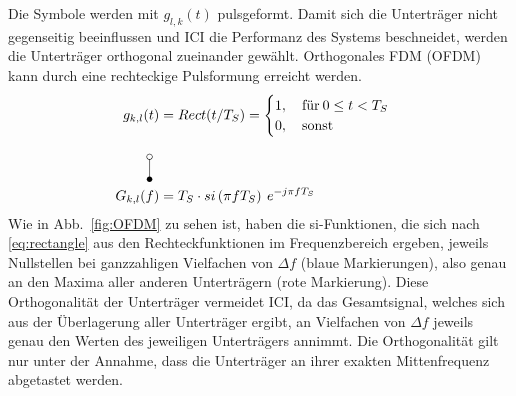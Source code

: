 Die Symbole werden mit $g_{l,k}(t)$ pulsgeformt. Damit sich die Unterträger nicht gegenseitig beeinflussen und \ac{ICI} die Performanz des Systems beschneidet, werden die Unterträger orthogonal zueinander gewählt. Orthogonales \ac{FDM} (OFDM) kann durch eine rechteckige Pulsformung erreicht werden. 
\begin{equation}
\label{eq:rectangle}
\begin{aligned}
g_{k,l}(t) &= Rect(t/T_S) = 
    \begin{cases}
    1, \quad \text{für} \: 0 \leq t < T_S \\
    0, \quad \text{sonst}
    \end{cases}\\
\rotatebox{270}{\laplace} \\
G_{k,l}(f) &= T_S \cdot si\left(\pi f T_S\right)\: e^{-j \pi f T_S}
\end{aligned}
\end{equation}
Wie in Abb.~\ref{fig:OFDM} zu sehen ist, haben die si-Funktionen, die sich nach \ref{eq:rectangle} aus den Rechteckfunktionen im Frequenzbereich ergeben, jeweils Nullstellen bei ganzzahligen Vielfachen von $\Delta f$ (blaue Markierungen), also genau an den Maxima aller anderen Unterträgern (rote Markierung). Diese Orthogonalität der Unterträger vermeidet \ac{ICI}, da das Gesamtsignal, welches sich aus der Überlagerung aller Unterträger ergibt, an Vielfachen von $\Delta f$ jeweils genau den Werten des jeweiligen Unterträgers annimmt. Die Orthogonalität gilt nur unter der Annahme, dass die Unterträger an ihrer exakten Mittenfrequenz abgetastet werden.\\
